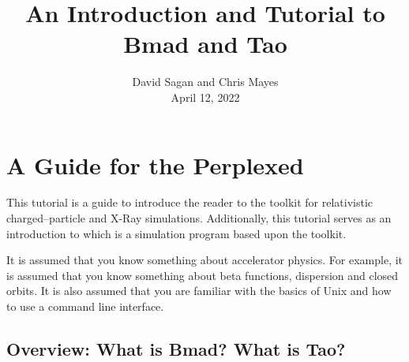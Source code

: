 \documentclass{hitec}     %
\title{An Introduction and Tutorial to Bmad and Tao}
\author{}
\date{David Sagan and Chris Mayes \\ April 12, 2022}
\newcommand{\Section}[1]{\section{#1}\vspace*{-1ex}}
\begin{document}
\maketitle

\cleardoublepage
{}
{}
\tableofcontents

\newpage

\Section{A Guide for the Perplexed}
\label{s:guide}

This tutorial is a guide to introduce the reader to the \bmad toolkit for relativistic
charged--particle and X-Ray simulations. Additionally, this tutorial serves as an introduction
to \tao which is a simulation program based upon the \bmad toolkit.

It is assumed that you know something about accelerator physics. For example, it is assumed that
you know something about beta functions, dispersion and closed orbits. It is also assumed that
you are familiar with the basics of Unix and how to use a command line interface.

\subsection{Overview: What is Bmad? What is Tao?}
\label{s:overview}
\end{document}
